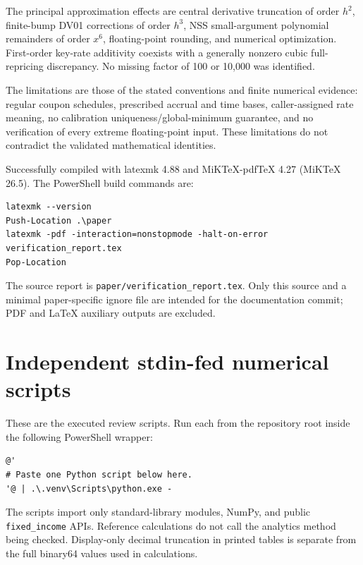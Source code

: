 \documentclass[12pt,a4paper]{article}
\newcommand{\BuildResult}{Successfully compiled with latexmk 4.88 and MiKTeX-pdfTeX 4.27 (MiKTeX 26.5).}
\begin{document}
The principal approximation effects are central derivative truncation
of order $h^2$, finite-bump DV01 corrections of order $h^3$,
NSS small-argument polynomial remainders of order $x^6$, floating-point
rounding, and numerical optimization. First-order key-rate additivity
coexists with a generally nonzero cubic full-repricing discrepancy.
No missing factor of 100 or 10,000 was identified.

The limitations are those of the stated conventions and finite numerical
evidence: regular coupon schedules, prescribed accrual and time bases,
caller-assigned rate meaning, no calibration uniqueness/global-minimum
guarantee, and no verification of every extreme floating-point input.
These limitations do not contradict the validated mathematical identities.

\BuildResult
The PowerShell build commands are:
\begingroup\small
\begin{verbatim}
latexmk --version
Push-Location .\paper
latexmk -pdf -interaction=nonstopmode -halt-on-error verification_report.tex
Pop-Location
\end{verbatim}
\endgroup
The source report is \texttt{paper/verification\_report.tex}.
Only this source and a minimal paper-specific ignore file are intended
for the documentation commit; PDF and LaTeX auxiliary outputs are excluded.

\appendix
\section{Independent stdin-fed numerical scripts}\label{sec:scripts}
These are the executed review scripts. Run each from the repository root
inside the following PowerShell wrapper:
\begin{verbatim}
@'
# Paste one Python script below here.
'@ | .\.venv\Scripts\python.exe -
\end{verbatim}
The scripts import only standard-library modules, NumPy, and public
\texttt{fixed\_income} APIs. Reference calculations do not call the
analytics method being checked. Display-only decimal truncation in printed
tables is separate from the full binary64 values used in calculations.
\end{document}
